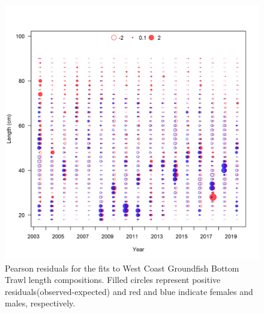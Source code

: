 \documentclass[11pt,
  english,
  a4paper,
]{article}
\begin{document}
\begin{figure}
\centering
\includegraphics[width=1\textwidth,height=1\textheight]{figs/comp_lenfit_residsflt8mkt0.png}
\caption{Pearson residuals for the fits to West Coast Groundfish Bottom Trawl length compositions. Filled circles represent positive residuals(observed-expected) and red and blue indicate females and males, respectively. \label{fig:lcomp_resid_8}}
\end{figure}

\tagmcend\tagstructend

\end{document}
